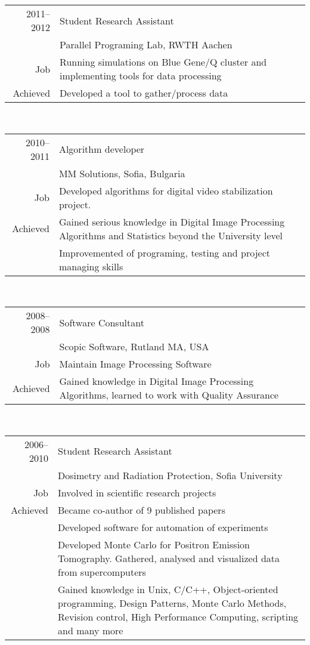 \begin{tabular}{ r p{} }
2011--2012 & Student Research Assistant \\
           & Parallel Programing Lab, RWTH Aachen\\
       Job & Running simulations on Blue Gene/Q cluster and implementing tools for data processing\\
Achieved   & Developed a tool to gather/process data \\
\end{tabular}\\
\begin{tabular}{ r p{} }
2010--2011  & Algorithm developer\\
            & MM Solutions, Sofia, Bulgaria\\
        Job & Developed algorithms for digital video stabilization project.\\
 Achieved   &  Gained serious knowledge in Digital Image Processing Algorithms and Statistics beyond the University level\\
            & Improvemented of programing, testing and project managing skills\\
\end{tabular}\\
\begin{tabular}{ r p{} }
2008--2008  & Software Consultant \\
            & Scopic Software, Rutland MA, USA\\
Job         & Maintain Image Processing Software\\
Achieved    & Gained knowledge in Digital Image Processing Algorithms, learned to work with Quality Assurance \\
\end{tabular}\\

\begin{tabular}{ r p{} }
2006--2010 & Student Research Assistant \\
           & Dosimetry and Radiation Protection, Sofia University\\
       Job & Involved in scientific research projects\\
Achieved   & Became co-author of 9 published papers\\
           & Developed software for automation of experiments\\
           & Developed Monte Carlo for Positron Emission Tomography. Gathered, analysed and visualized data from supercomputers\\
           & Gained knowledge in Unix, C/C++, Object-oriented programming, Design Patterns, Monte Carlo Methods, Revision control, High Performance Computing, scripting and many more\\
\end{tabular}\\
